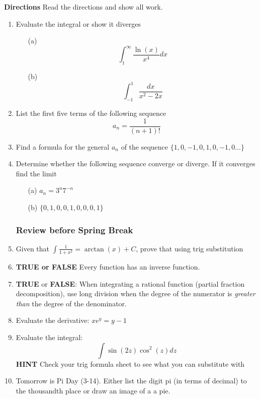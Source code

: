 \documentclass[12pt]{article}
\begin{document}
\textbf{Directions} Read the directions and show all work. 
\begin{enumerate}
    \item Evaluate the integral or show it diverges
    \begin{itemize}
        \item[(a)] $$\int_{1}^{\infty} \frac{\ln(x)}{x^{4}} dx $$
        \vspace{2cm}
        \item[(b)] $$ \int_{-1}^{1} \frac{dx}{x^{2} -2x} $$
        \vspace{2cm}
    \end{itemize}
    \item List the first five terms of the following sequence
    $$ a_n = \frac{1}{(n+1)!} $$
    \vspace{2cm}
    \item Find a formula for the general $a_n$ of the sequence 
    $\{1,0,-1,0,1,0,-1,0 ... \}$
    \vspace{2cm}
    \item Determine whether the following sequence converge or diverge. If it converges find the limit 
    \begin{itemize}
        \item[(a)] $a_n = 3^n 7^{-n}$ 
        \vspace{2cm}
        \item[(b)] $\{0,1,0,0,1,0,0,0,1\}$
        \clearpage
    \end{itemize}


\subsubsection*{Review before Spring Break}
    \item Given that $\int \frac{1}{1+x^{2}} = \arctan(x) + C$, prove that using trig substitution 
    \vspace{3cm}
    \item \textbf{TRUE or FALSE} Every function has an inverse function. 
    \vspace{1mm}
    \item \textbf{TRUE} or \textbf{FALSE}: When integrating a rational function (partial fraction decomposition), use long division when the degree of the numerator is \textit{greater than} the degree of the denominator.
    \vspace{1mm}
    \item Evaluate the derivative: $xe^{y} = y - 1$
    \vspace{3cm}
    \item Evaluate the integral:
    $$ \int \sin(2z) \cos^{2}(z) dz $$
    \textbf{HINT} Check your trig formula sheet to see what you can substitute with 
    \vspace{3cm}
    \item Tomorrow is Pi Day (3-14). Either list the digit pi (in terms of decimal) to the thousandth place or draw an image of a a pie. 
\end{enumerate}
\end{document}
